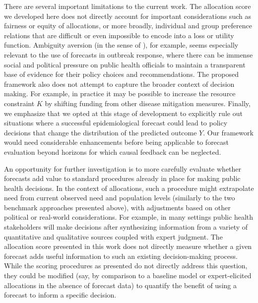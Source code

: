 \documentclass{article}\usepackage[]{graphicx}\usepackage[]{xcolor}
\begin{document}
There are several important limitations to the current work. The allocation score we developed here does not directly
account for important considerations such as fairness or equity of allocations, or more broadly, individual and group
preference relations that are difficult or even impossible to encode into a loss or utility function.  Ambiguity aversion
(in the sense of \cite{ellsberg1961risk}), for example, seems especially relevant to the use of forecasts in outbreak
response, where there can be immense social and political pressure on public health officials to maintain a transparent
base of evidence for their policy choices and recommendations. The proposed framework also does not attempt to capture
the broader context of decision making. For example, in practice it may be possible to increase the resource constraint
$K$ by shifting funding from other disease mitigation measures. Finally, we emphasize that we opted at this stage of
development to explicitly rule out situations where a successful
epidemiological forecast could lead to policy decisions that change the distribution of the predicted outcome $Y$. Our
framework would need considerable enhancements before being applicable to forecast evaluation beyond horizons for which
causal feedback can be neglected.

An opportunity for further investigation is to more carefully evaluate whether forecasts add value to 
standard  procedures already in place for making public health decisions. In the context of allocations,
such a procedure might extrapolate need from current observed need and population levels (similarly to the two benchmark
approaches presented above), with adjustments based on other political or real-world considerations. For example, in
many settings public health stakeholders will make decisions after synthesizing information from a variety of
quantitative and qualitative sources coupled with expert judgment. The allocation score presented in this work does not
directly measure whether a given forecast adds useful information to such an existing decision-making process. While the
scoring procedures as presented do not directly address this question, they could be modified (say, by comparison to a
baseline model or expert-elicited allocations in the absence of forecast data) to quantify the benefit of using a
forecast to inform a specific decision.
\end{document}
